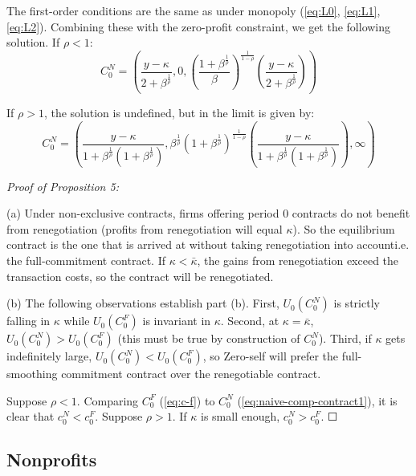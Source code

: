 \documentclass[11pt,english]{article}
\theoremstyle{plain}
\theoremstyle{definition}
\begin{document}
The first-order conditions are the same as under monopoly (\ref{eq:L0},
\ref{eq:L1}, \ref{eq:L2}). Combining these with the zero-profit
constraint, we get the following solution. If $\rho<1$: 
\begin{equation}
C_{0}^{N}=\left(\frac{y-\kappa}{2+\beta^{\frac{1}{\rho}}},0,\left(\frac{1+\beta^{\frac{1}{\rho}}}{\beta}\right)^{\frac{1}{1-\rho}}\left(\frac{y-\kappa}{2+\beta^{\frac{1}{\rho}}}\right)\right)\label{eq:naive-comp-contract1}
\end{equation}

If $\rho>1$, the solution is undefined, but in the limit is given
by: 
\begin{equation}
C_{0}^{N}=\left(\frac{y-\kappa}{1+\beta^{\frac{1}{\rho}}\left(1+\beta^{\frac{1}{\rho}}\right)},\beta^{\frac{1}{\rho}}\left(1+\beta^{\frac{1}{\rho}}\right)^{\frac{1}{1-\rho}}\left(\frac{y-\kappa}{1+\beta^{\frac{1}{\rho}}\left(1+\beta^{\frac{1}{\rho}}\right)}\right),\infty\right)\label{eq:naive-comp-contract2}
\end{equation}

\emph{Proof of Proposition 5:}

(a) Under non-exclusive contracts, firms offering period 0 contracts
do not benefit from renegotiation (profits from renegotiation will
equal $\kappa$). So the equilibrium contract is the one that is arrived
at without taking renegotiation into account\textendash i.e. the full-commitment
contract. If $\kappa<\bar{\kappa}$, the gains from renegotiation
exceed the transaction costs, so the contract will be renegotiated.

(b) The following observations establish part (b). First, $U_{0}\left(C_{0}^{N}\right)$
is strictly falling in $\kappa$ while $U_{0}\left(C_{0}^{F}\right)$
is invariant in $\kappa$. Second, at $\kappa=\bar{\kappa}$, $U_{0}\left(C_{0}^{N}\right)>U_{0}\left(C_{0}^{F}\right)$
(this must be true by construction of $C_{0}^{N}$). Third, if $\kappa$
gets indefinitely large, $U_{0}\left(C_{0}^{N}\right)<U_{0}\left(C_{0}^{F}\right)$,
so Zero-self will prefer the full-smoothing commitment contract over
the renegotiable contract.

Suppose $\rho<1$. Comparing $C_{0}^{F}$ (\ref{eq:c-f}) to $C_{0}^{N}$
(\ref{eq:naive-comp-contract1}), it is clear that $c_{0}^{N}<c_{0}^{F}$.
Suppose $\rho>1$. If $\kappa$ is small enough, $c_{0}^{N}>c_{0}^{F}$.
$\Square$

\subsection{Nonprofits}
\end{document}
